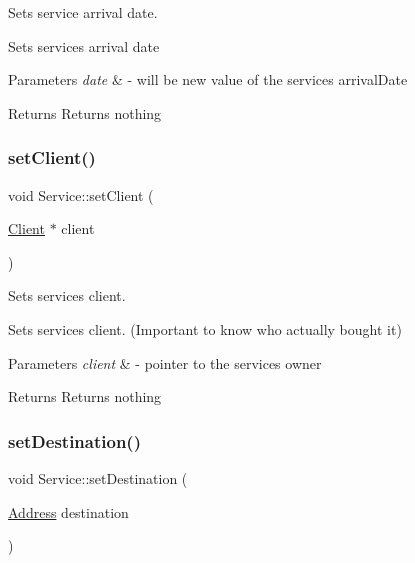 Sets service arrival date. 

Sets service\textquotesingle{}s arrival date 
\begin{DoxyParams}{Parameters}
{\em date} & -\/ will be new value of the service\textquotesingle{}s arrival\+Date \\
\hline
\end{DoxyParams}
\begin{DoxyReturn}{Returns}
Returns nothing 
\end{DoxyReturn}
\mbox{\label{class_service_a1cf3d0b85e44bd7ec58e4a12a7432aef}} 
\subsubsection{\texorpdfstring{set\+Client()}{setClient()}}
{\footnotesize\ttfamily void Service\+::set\+Client (\begin{DoxyParamCaption}\item[{\hyperlink{class_client}{Client} $\ast$}]{client }\end{DoxyParamCaption})}



Sets service\textquotesingle{}s client. 

Sets service\textquotesingle{}s client. (Important to know who actually bought it) 
\begin{DoxyParams}{Parameters}
{\em client} & -\/ pointer to the service\textquotesingle{}s owner \\
\hline
\end{DoxyParams}
\begin{DoxyReturn}{Returns}
Returns nothing 
\end{DoxyReturn}
\mbox{\label{class_service_a1c2082379deaf672919165e540afcab2}} 
\subsubsection{\texorpdfstring{set\+Destination()}{setDestination()}}
{\footnotesize\ttfamily void Service\+::set\+Destination (\begin{DoxyParamCaption}\item[{\hyperlink{class_address}{Address}}]{destination }\end{DoxyParamCaption})}



